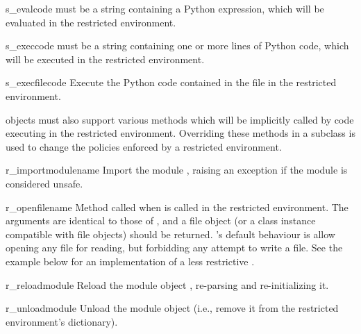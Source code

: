 \begin{methoddesc}{s_eval}{code}
 must be a string containing a Python expression, which will
be evaluated in the restricted environment.  
\end{methoddesc}

\begin{methoddesc}{s_exec}{code}
 must be a string containing one or more lines of Python code,
which will be executed in the restricted environment.  
\end{methoddesc}

\begin{methoddesc}{s_execfile}{code}
Execute the Python code contained in the file  in the
restricted environment.
\end{methoddesc}

 objects must also support various methods which will be
implicitly called by code executing in the restricted environment.
Overriding these methods in a subclass is used to change the policies
enforced by a restricted environment.

\begin{methoddesc}{r_import}{modulename}
Import the module , raising an 
exception if the module is considered unsafe.
\end{methoddesc}

\begin{methoddesc}{r_open}{filename}
Method called when  is called in the restricted
environment.  The arguments are identical to those of ,
and a file object (or a class instance compatible with file objects)
should be returned.  's default behaviour is allow opening
any file for reading, but forbidding any attempt to write a file.  See
the example below for an implementation of a less restrictive
.
\end{methoddesc}

\begin{methoddesc}{r_reload}{module}
Reload the module object , re-parsing and re-initializing it.  
\end{methoddesc}

\begin{methoddesc}{r_unload}{module}
Unload the module object  (i.e., remove it from the
restricted environment's  dictionary).
\end{methoddesc}

